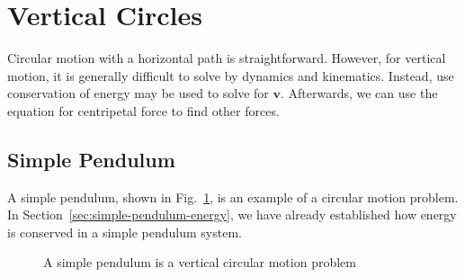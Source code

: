 


\section{Vertical Circles}

Circular motion with a horizontal path is straightforward. However, for
vertical motion, it is generally difficult to solve by dynamics and kinematics.
Instead, use conservation of energy may be used to solve for $\bm v$.
Afterwards, we can use the equation for centripetal force to find other forces.




\subsection{Simple Pendulum}
A simple pendulum, shown in Fig.~\ref{fig:simple-pendulum-again}, is an example
of a circular motion problem. In Section~\ref{sec:simple-pendulum-energy}, we
have already established how energy is conserved in a simple pendulum system.
\begin{figure}[ht]
  \centering
  \caption{A simple pendulum is a vertical circular motion problem}
  \label{fig:simple-pendulum-again}
\end{figure}

